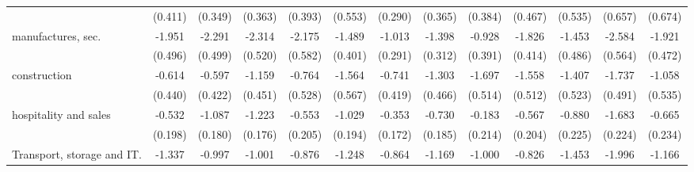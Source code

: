 {\begin{tabular}{l*{12}{c}}
                    &     (0.411)         &     (0.349)         &     (0.363)         &     (0.393)         &     (0.553)         &     (0.290)         &     (0.365)         &     (0.384)         &     (0.467)         &     (0.535)         &     (0.657)         &     (0.674)         \\
[1em]
manufactures, sec.  &      -1.951\sym{***}&      -2.291\sym{***}&      -2.314\sym{***}&      -2.175\sym{***}&      -1.489\sym{***}&      -1.013\sym{***}&      -1.398\sym{***}&      -0.928\sym{*}  &      -1.826\sym{***}&      -1.453\sym{**} &      -2.584\sym{***}&      -1.921\sym{***}\\
                    &     (0.496)         &     (0.499)         &     (0.520)         &     (0.582)         &     (0.401)         &     (0.291)         &     (0.312)         &     (0.391)         &     (0.414)         &     (0.486)         &     (0.564)         &     (0.472)         \\
[1em]
construction        &      -0.614         &      -0.597         &      -1.159\sym{*}  &      -0.764         &      -1.564\sym{**} &      -0.741         &      -1.303\sym{**} &      -1.697\sym{***}&      -1.558\sym{**} &      -1.407\sym{**} &      -1.737\sym{***}&      -1.058\sym{*}  \\
                    &     (0.440)         &     (0.422)         &     (0.451)         &     (0.528)         &     (0.567)         &     (0.419)         &     (0.466)         &     (0.514)         &     (0.512)         &     (0.523)         &     (0.491)         &     (0.535)         \\
[1em]
hospitality and sales&      -0.532\sym{**} &      -1.087\sym{***}&      -1.223\sym{***}&      -0.553\sym{**} &      -1.029\sym{***}&      -0.353\sym{*}  &      -0.730\sym{***}&      -0.183         &      -0.567\sym{**} &      -0.880\sym{***}&      -1.683\sym{***}&      -0.665\sym{**} \\
                    &     (0.198)         &     (0.180)         &     (0.176)         &     (0.205)         &     (0.194)         &     (0.172)         &     (0.185)         &     (0.214)         &     (0.204)         &     (0.225)         &     (0.224)         &     (0.234)         \\
[1em]
Transport, storage and IT.&      -1.337\sym{***}&      -0.997\sym{**} &      -1.001\sym{***}&      -0.876\sym{**} &      -1.248\sym{***}&      -0.864\sym{***}&      -1.169\sym{***}&      -1.000\sym{**} &      -0.826\sym{**} &      -1.453\sym{***}&      -1.996\sym{***}&      -1.166\sym{**} \\

\end{tabular}}

